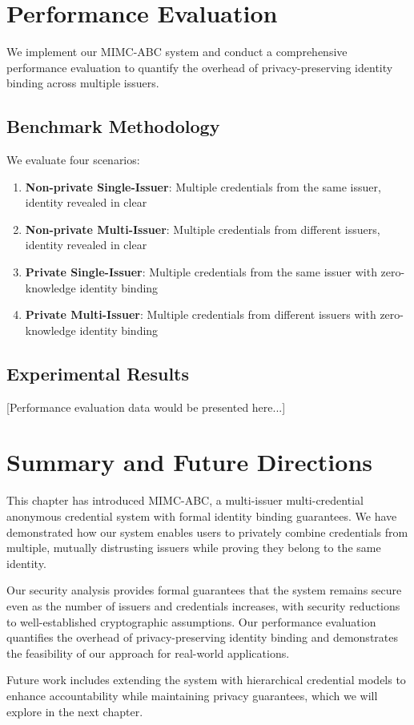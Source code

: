 \section{Performance Evaluation}
We implement our MIMC-ABC system and conduct a comprehensive performance evaluation to quantify the overhead of privacy-preserving identity binding across multiple issuers.

\subsection{Benchmark Methodology}
We evaluate four scenarios:
\begin{enumerate}
    \item \textbf{Non-private Single-Issuer}: Multiple credentials from the same issuer, identity revealed in clear
    \item \textbf{Non-private Multi-Issuer}: Multiple credentials from different issuers, identity revealed in clear
    \item \textbf{Private Single-Issuer}: Multiple credentials from the same issuer with zero-knowledge identity binding
    \item \textbf{Private Multi-Issuer}: Multiple credentials from different issuers with zero-knowledge identity binding
\end{enumerate}

\subsection{Experimental Results}
[Performance evaluation data would be presented here...]

\section{Summary and Future Directions}
This chapter has introduced MIMC-ABC, a multi-issuer multi-credential anonymous credential system with formal identity binding guarantees. We have demonstrated how our system enables users to privately combine credentials from multiple, mutually distrusting issuers while proving they belong to the same identity.

Our security analysis provides formal guarantees that the system remains secure even as the number of issuers and credentials increases, with security reductions to well-established cryptographic assumptions. Our performance evaluation quantifies the overhead of privacy-preserving identity binding and demonstrates the feasibility of our approach for real-world applications.

Future work includes extending the system with hierarchical credential models to enhance accountability while maintaining privacy guarantees, which we will explore in the next chapter.